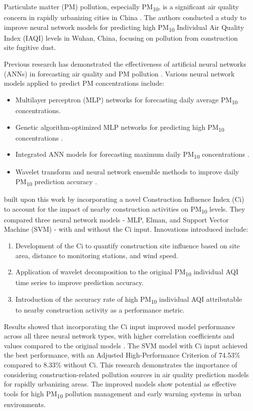 \documentclass{book}
\numberwithin{equation}{section}
\numberwithin{figure}{section}
\begin{document}
Particulate matter (PM) pollution, especially PM\textsubscript{10}, is a significant air quality concern in rapidly urbanizing cities in China \citep{Feng2013}. The authors conducted a study to improve neural network models for predicting high PM\textsubscript{10} Individual Air Quality Index (IAQI) levels in Wuhan, China, focusing on pollution from construction site fugitive dust.

Previous research has demonstrated the effectiveness of artificial neural networks (ANNs) in forecasting air quality and PM pollution \citep{Brunelli2007}. Various neural network models applied to predict PM concentrations include:
\begin{itemize}
    \item Multilayer perceptron (MLP) networks for forecasting daily average PM\textsubscript{10} concentrations.
    \item Genetic algorithm-optimized MLP networks for predicting high PM\textsubscript{10} concentrations \citep{Grivas2006}.
    \item Integrated ANN models for forecasting maximum daily PM\textsubscript{10} concentrations \citep{Perez2006}.
    \item Wavelet transform and neural network ensemble methods to improve daily PM\textsubscript{10} prediction accuracy \citep{Siwek2012}.
\end{itemize}

\citep{Feng2013} built upon this work by incorporating a novel Construction Influence Index (Ci) to account for the impact of nearby construction activities on PM\textsubscript{10} levels. They compared three neural network models - MLP, Elman, and Support Vector Machine (SVM) - with and without the Ci input. Innovations introduced include:
\begin{enumerate}
    \item Development of the Ci to quantify construction site influence based on site area, distance to monitoring stations, and wind speed.
    \item Application of wavelet decomposition to the original PM\textsubscript{10} individual AQI time series to improve prediction accuracy.
    \item Introduction of the accuracy rate of high PM\textsubscript{10} individual AQI attributable to nearby construction activity as a performance metric.
\end{enumerate}
Results showed that incorporating the Ci input improved model performance across all three neural network types, with higher correlation coefficients and values compared to the original models \citep{Feng2013}. The SVM model with Ci input achieved the best performance, with an Adjusted High-Performance Criterion of 74.53\% compared to 8.33\% without Ci. This research demonstrates the importance of considering construction-related pollution sources in air quality prediction models for rapidly urbanizing areas. The improved models show potential as effective tools for high PM\textsubscript{10} pollution management and early warning systems in urban environments.
\vspace{-5mm} %
\end{document}
